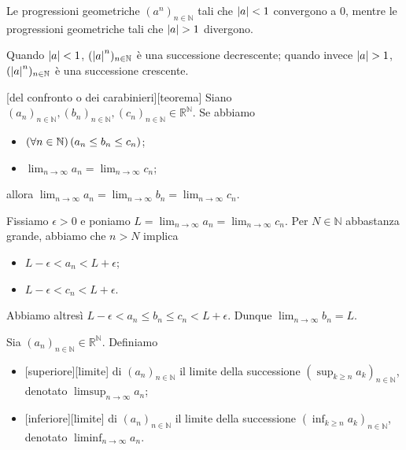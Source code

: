 \begin{Theorem}
	Le progressioni geometriche $(a^n)_{n \in \mathbb{N}}$ tali che
  $\left \lvert a \right \rvert < 1$ convergono a $0$, mentre le progressioni geometriche
  tali che $\left \lvert a \right \rvert > 1$ divergono.
\end{Theorem}
\Proof Quando $\left \lvert a \right \rvert < 1$,
$(\left \lvert a \right \rvert^n)_{n \in \mathbb{N}}$ \`e una successione decrescente;
quando invece $\left \lvert a \right \rvert > 1$,
$(\left \lvert a \right \rvert^n)_{n \in \mathbb{N}}$ \`e una successione crescente.
\begin{Theorem}
	[del confronto o dei carabinieri][teorema]
	Siano
  $(a_n)_{n \in \mathbb{N}},
  (b_n)_{n \in \mathbb{N}},
  (c_n)_{n \in \mathbb{N}} \in \mathbb{R}^\mathbb{N}$.
  Se abbiamo
	\begin{itemize}
		\item $\left ( \forall n \in \mathbb{N} \right ) \left ( a_n \leq b_n \leq c_n \right )$;
		\item $\lim_{n \rightarrow \infty} a_n = \lim_{n \rightarrow \infty} c_n$;
	\end{itemize}
	allora
  $\lim_{n \rightarrow \infty} a_n =
  \lim_{n \rightarrow \infty} b_n =
  \lim_{n \rightarrow \infty} c_n$.
\end{Theorem}
\Proof Fissiamo $\epsilon > 0$ e poniamo
$L = \lim_{n \rightarrow \infty} a_n = \lim_{n \rightarrow \infty} c_n$.
Per $N \in \mathbb{N}$ abbastanza grande, abbiamo che $n > N$ implica
\begin{itemize}
	\item $L - \epsilon < a_n < L + \epsilon$;
	\item $L - \epsilon < c_n < L + \epsilon$.
\end{itemize}
Abbiamo altres\`i
$L - \epsilon < a_n \leq b_n \leq c_n < L + \epsilon$.
Dunque $\lim_{n \rightarrow \infty} b_n = L$.
\begin{Definition}
  Sia $(a_n)_{n \in \mathbb{N}} \in \mathbb{R}^\mathbb{N}$.
  Definiamo
  \begin{itemize}
    \item {}[superiore][limite]
      di $(a_n)_{n \in \mathbb{N}}$ il limite della successione
      $(\sup_{k \geq n} a_k)_{n \in \mathbb{N}}$,
      denotato $\limsup_{n \rightarrow \infty} a_n$;
    \item {}[inferiore][limite]
      di $(a_n)_{n \in \mathbb{N}}$ il limite della successione
      $(\inf_{k \geq n} a_k)_{n \in \mathbb{N}}$,
      denotato $\liminf_{n \rightarrow \infty} a_n$.
  \end{itemize}
\end{Definition}
